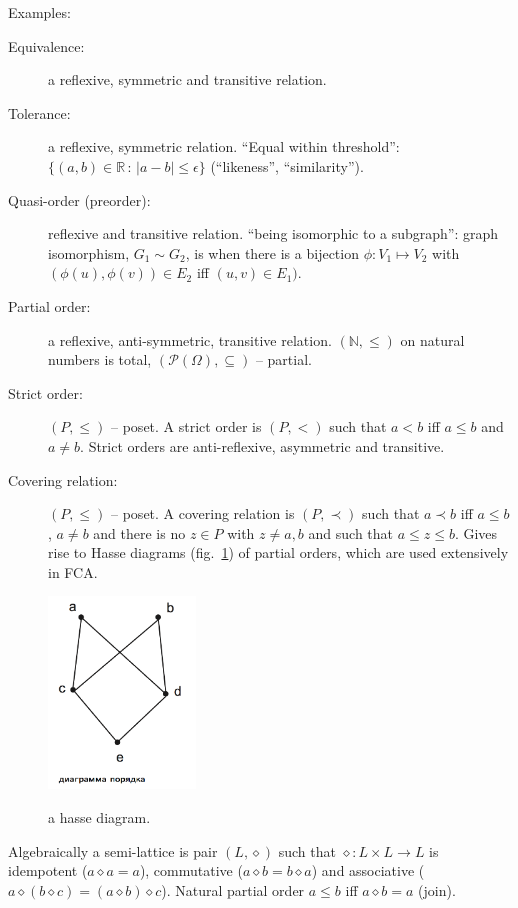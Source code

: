 \documentclass[a4paper]{article}
\begin{document}
\noindent Examples: \begin{description}
    \item[Equivalence:] a reflexive, symmetric and transitive relation.
    \item[Tolerance:] a reflexive, symmetric relation.
    ``Equal within threshold'': $\{(a,b)\in \mathbb{R}\,:\, |a-b|\leq \epsilon\}$
    (``likeness'', ``similarity'').
    \item[Quasi-order (preorder):] reflexive and transitive relation.
    ``being isomorphic to a subgraph'': graph isomorphism, $G_1 \sim G_2$, is when
    there is a bijection $\phi:V_1\mapsto V_2$ with $(\phi(u),\phi(v))\in E_2$ iff
    $(u,v)\in E_1)$.
    \item[Partial order:] a reflexive, anti-symmetric, transitive relation.
    $(\mathbb{N}, \leq)$ on natural numbers is total, $(\mathcal{P}(\Omega),
    \subseteq)$ -- partial.
    \item[Strict order:] $(P, \leq)$ -- poset. A strict order is $(P, <)$ such
    that $a<b$ iff $a\leq b$ and $a\neq b$. Strict orders are anti-reflexive,
    asymmetric and transitive.
    \item[Covering relation:] $(P, \leq)$ -- poset. A covering relation is $(P, \prec)$
    such that $a\prec b$ iff $a\leq b$, $a\neq b$ and there is no $z\in P$ with $z\neq a,b$
    and such that $a\leq z\leq b$. Gives rise to Hasse diagrams (fig.~\ref{fig:hasse})
    of partial orders, which are used extensively in FCA.
\end{description}
\begin{figure}
    \centering
    \includegraphics[width=0.35\textwidth]{hasse.png}
    \label{fig:hasse}
    \caption{a hasse diagram.}
\end{figure}

Algebraically a semi-lattice is pair $(L, \diamond)$ such that $\diamond: L\times L \to L$
is idempotent ($a\diamond a=a$), commutative ($a \diamond b = b \diamond a$) and associative
($a \diamond (b \diamond c) = (a \diamond b) \diamond c$). Natural partial order $a\leq b$
iff $a\diamond b = a$ (join).
\end{document}
